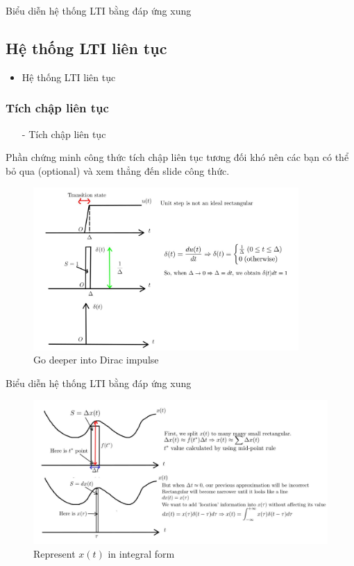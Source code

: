 \documentclass[8pt]{beamer}
\begin{document}
\begin{frame}{Biểu diễn hệ thống LTI bằng đáp ứng xung}
\subsection{Hệ thống LTI liên tục}
\begin{itemize}
	\item Hệ thống LTI liên tục
\end{itemize}
\subsubsection{Tích chập liên tục}
\begin{itemize}
	\item[-] Tích chập liên tục
\end{itemize}
Phần chứng minh công thức tích chập liên tục tương đối khó nên các bạn có thể bỏ qua (optional) và xem thẳng đến slide công thức.

\begin{figure}[h]
			\includegraphics[width=0.9\textwidth]{dirac.jpg}
			\caption{Go deeper into Dirac impulse}\label{fig:re5}
		\end{figure}
\end{frame}
\begin{frame}{Biểu diễn hệ thống LTI bằng đáp ứng xung}
\begin{figure}[h]
			\includegraphics[width=1\textwidth]{tau.jpg}
			\caption{Represent $x(t)$ in integral form}\label{fig:re6}
		\end{figure}
\end{frame}
\end{document}
